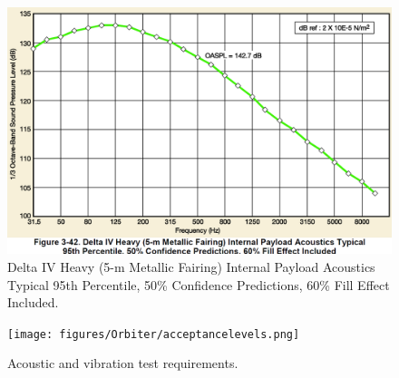 \begin{figure}[htb]
\centering
\includegraphics[scale=0.3]{figures/Orbiter/acoustics.png}
\caption{Delta IV Heavy (5-m Metallic Fairing) Internal Payload Acoustics Typical 95th Percentile, 50\% Confidence Predictions, 60\% Fill Effect Included\cite{Atlasm}.}
\end{figure}

\begin{figure}[htb]
\centering
\texttt{[image: figures/Orbiter/acceptancelevels.png]}
\caption{Acoustic and vibration test requirements\cite{Atlasm}.}
\label{fig:testlevels}
\end{figure}

